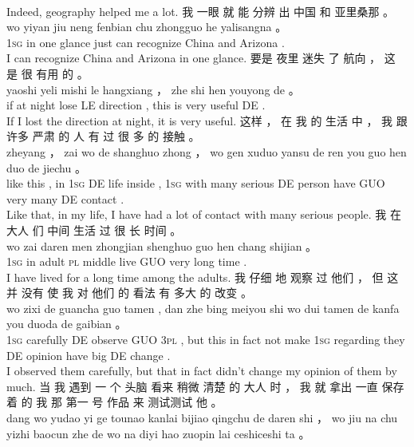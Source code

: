 \documentclass[UTF8]{ctexart}
\begin{document}
\begin{exe}
\\
\trans Indeed, geography helped me a lot. 
\ex
\glll
我 一眼 就 能 分辨 出 中国 和 亚里桑那 。
\\
wo yiyan jiu neng fenbian chu zhongguo he yalisangna 。
\\
\textsc{1sg} {in one glance} just can recognize China and Arizona .
\\
\trans I can recognize China and Arizona in one glance.
\ex
\glll
要是 夜里 迷失 了 航向 ， 这 是 很 有用 的 。
\\
yaoshi yeli mishi le hangxiang ， zhe shi hen youyong de 。
\\
if {at night} lose LE direction , this is very useful DE .
\\
\trans If I lost the direction at night, it is very useful. 
\ex
\glll
这样 ， 在 我 的 生活 中 ， 我 跟 许多 严肃 的 人 有 过 很 多 的 接触 。
\\
zheyang  ， zai wo de shanghuo zhong ， wo gen xuduo yansu de ren you guo hen duo de jiechu 。
\\
{like this} , in \textsc{1sg} DE life inside , \textsc{1sg} with many serious DE person have GUO very many DE contact .
\\
\trans Like that, in my life, I have had a lot of contact with many serious people. 
\ex
\glll
我 在 大人 们 中间 生活 过 很 长 时间 。
\\
wo zai daren men zhongjian shenghuo guo hen chang shijian 。
\\
\textsc{1sg} in adult \textsc{pl} middle live GUO very long time .
\\
\trans I have lived for a long time among the adults. 
\ex
\glll
我 仔细 地 观察 过 他们 ， 但 这 并 没有 使 我 对 他们 的 看法 有 多大 的 改变 。
\\
wo zixi de guancha guo tamen , dan zhe bing meiyou shi wo dui tamen de kanfa you duoda de gaibian 。
\\
\textsc{1sg} carefully DE observe GUO \textsc{3pl} , but this {in fact} not make \textsc{1sg} regarding they DE opinion have big DE change .
\\
\trans I observed them carefully, but that in fact didn't change my opinion of them by much. 
\ex
\glll
当 我 遇到 一 个 头脑 看来 稍微 清楚 的 大人 时 ， 我 就 拿出 一直 保存 着 的 我 那 第一 号 作品 来 测试测试 他 。
\\
dang wo yudao yi ge tounao kanlai bijiao qingchu de daren shi ， wo jiu  na chu yizhi baocun zhe de wo na  diyi  hao zuopin lai ceshiceshi ta 。
\\

\end{exe}
\end{document}
